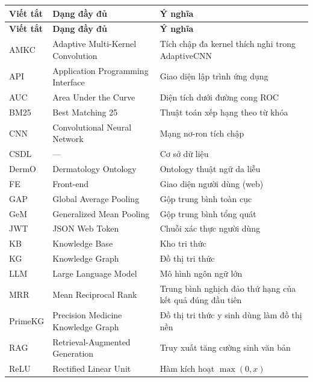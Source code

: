 
\begin{longtable}{|>{\raggedright\arraybackslash}p{0.17\dimexpr\linewidth-6\tabcolsep\relax}|>{\raggedright\arraybackslash}p{0.38\dimexpr\linewidth-6\tabcolsep\relax}|>{\raggedright\arraybackslash}p{0.45\dimexpr\linewidth-6\tabcolsep\relax}|}
\hline
\textbf{Viết tắt} & \textbf{Dạng đầy đủ} & \textbf{Ý nghĩa} \\ \hline
\endfirsthead
\hline
\textbf{Viết tắt} & \textbf{Dạng đầy đủ} & \textbf{Ý nghĩa} \\ \hline
\endhead
AMKC & Adaptive Multi-Kernel Convolution & Tích chập đa kernel thích nghi trong AdaptiveCNN \\ \hline
API & Application Programming Interface & Giao diện lập trình ứng dụng \\ \hline
AUC & Area Under the Curve & Diện tích dưới đường cong ROC \\ \hline
BM25 & Best Matching 25 & Thuật toán xếp hạng theo từ khóa \\ \hline
CNN & Convolutional Neural Network & Mạng nơ-ron tích chập \\ \hline
CSDL & --- & Cơ sở dữ liệu \\ \hline
DermO & Dermatology Ontology & Ontology thuật ngữ da liễu \\ \hline
FE & Front-end & Giao diện người dùng (web) \\ \hline
GAP & Global Average Pooling & Gộp trung bình toàn cục \\ \hline
GeM & Generalized Mean Pooling & Gộp trung bình tổng quát \\ \hline
JWT & JSON Web Token & Chuỗi xác thực người dùng \\ \hline
KB & Knowledge Base & Kho tri thức \\ \hline
KG & Knowledge Graph & Đồ thị tri thức \\ \hline
LLM & Large Language Model & Mô hình ngôn ngữ lớn \\ \hline
MRR & Mean Reciprocal Rank & Trung bình nghịch đảo thứ hạng của kết quả đúng đầu tiên \\ \hline
PrimeKG & Precision Medicine Knowledge Graph & Đồ thị tri thức y sinh dùng làm đồ thị nền \\ \hline
RAG & Retrieval-Augmented Generation & Truy xuất tăng cường sinh văn bản \\ \hline
ReLU & Rectified Linear Unit & Hàm kích hoạt $\max(0,x)$ \\ \hline

\end{longtable}
